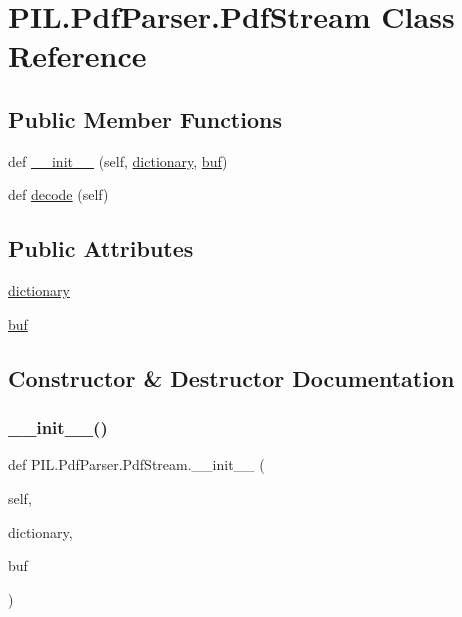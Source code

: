 \hypertarget{classPIL_1_1PdfParser_1_1PdfStream}{}\section{P\+I\+L.\+Pdf\+Parser.\+Pdf\+Stream Class Reference}
\label{classPIL_1_1PdfParser_1_1PdfStream}
\subsection*{Public Member Functions}
\begin{DoxyCompactItemize}
\item 
def \hyperlink{classPIL_1_1PdfParser_1_1PdfStream_a88ed7d6f85bde60157181c82530b12c5}{\+\_\+\+\_\+init\+\_\+\+\_\+} (self, \hyperlink{classPIL_1_1PdfParser_1_1PdfStream_a842a11e378a90b6a204f9b3138b31b4f}{dictionary}, \hyperlink{classPIL_1_1PdfParser_1_1PdfStream_a077b35f8665b8bd48ac13a6d344ef9d2}{buf})
\item 
def \hyperlink{classPIL_1_1PdfParser_1_1PdfStream_a98510e819566cd6184fc62607b25bf2f}{decode} (self)
\end{DoxyCompactItemize}
\subsection*{Public Attributes}
\begin{DoxyCompactItemize}
\item 
\hyperlink{classPIL_1_1PdfParser_1_1PdfStream_a842a11e378a90b6a204f9b3138b31b4f}{dictionary}
\item 
\hyperlink{classPIL_1_1PdfParser_1_1PdfStream_a077b35f8665b8bd48ac13a6d344ef9d2}{buf}
\end{DoxyCompactItemize}


\subsection{Constructor \& Destructor Documentation}
\mbox{\label{classPIL_1_1PdfParser_1_1PdfStream_a88ed7d6f85bde60157181c82530b12c5}} 
\subsubsection{\texorpdfstring{\+\_\+\+\_\+init\+\_\+\+\_\+()}{\_\_init\_\_()}}
{\footnotesize\ttfamily def P\+I\+L.\+Pdf\+Parser.\+Pdf\+Stream.\+\_\+\+\_\+init\+\_\+\+\_\+ (\begin{DoxyParamCaption}\item[{}]{self,  }\item[{}]{dictionary,  }\item[{}]{buf }\end{DoxyParamCaption})}



